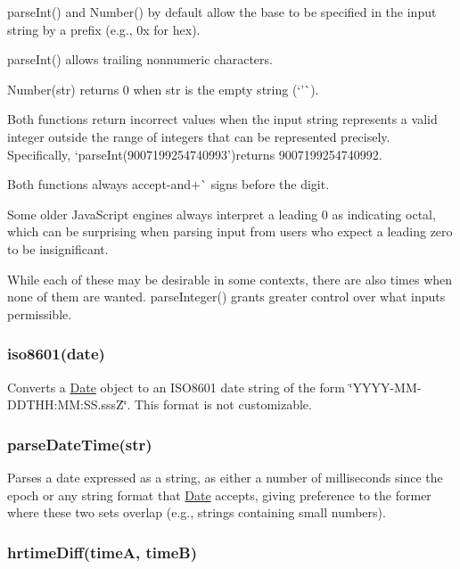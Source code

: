 \begin{DoxyItemize}
\item {\ttfamily parse\+Int()} and {\ttfamily Number()} by default allow the base to be specified in the input string by a prefix (e.\+g., {\ttfamily 0x} for hex).
\item {\ttfamily parse\+Int()} allows trailing nonnumeric characters.
\item {\ttfamily Number(str)} returns 0 when {\ttfamily str} is the empty string (`'\textquotesingle{}\`{}).
\item Both functions return incorrect values when the input string represents a valid integer outside the range of integers that can be represented precisely. Specifically, `parse\+Int(\textquotesingle{}9007199254740993'){\ttfamily returns 9007199254740992.}
\item {\ttfamily Both functions always accept}-\/{\ttfamily and}+\`{} signs before the digit.
\item Some older Java\+Script engines always interpret a leading 0 as indicating octal, which can be surprising when parsing input from users who expect a leading zero to be insignificant.
\end{DoxyItemize}

While each of these may be desirable in some contexts, there are also times when none of them are wanted. {\ttfamily parse\+Integer()} grants greater control over what input\textquotesingle{}s permissible.

\subsubsection*{iso8601(date)}

Converts a \mbox{\hyperlink{classDate}{Date}} object to an I\+S\+O8601 date string of the form \char`\"{}\+Y\+Y\+Y\+Y-\/\+M\+M-\/\+D\+D\+T\+H\+H\+:\+M\+M\+:\+S\+S.\+sss\+Z\char`\"{}. This format is not customizable.

\subsubsection*{parse\+Date\+Time(str)}

Parses a date expressed as a string, as either a number of milliseconds since the epoch or any string format that \mbox{\hyperlink{classDate}{Date}} accepts, giving preference to the former where these two sets overlap (e.\+g., strings containing small numbers).

\subsubsection*{hrtime\+Diff(time\+A, time\+B)}

